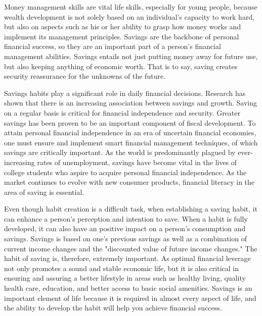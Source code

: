Money management skills are vital life skills, especially for young people, because wealth development is not solely based on an individual's capacity to work hard, but also on aspects such as his or her ability to grasp how money works and implement its management principles. Savings are the backbone of personal financial success, so they are an important part of a person's financial management abilities. Savings entails not just putting money away for future use, but also keeping anything of economic worth. That is to say, saving creates security reassurance for the unknowns of the future.\cite{Loibl}

Savings habits play a significant role in daily financial decisions. Research has shown that there is an increasing association between savings and growth. Saving on a regular basis is critical for financial independence and security. Greater savings has been proven to be an important component of fiscal development. To attain personal financial independence in an era of uncertain financial economies, one must ensure and implement smart financial management techniques, of which savings are critically important. As the world is predominantly plagued by ever-increasing rates of unemployment, savings have become vital in the lives of college students who aspire to acquire personal financial independence.\cite{Fiergbor} As the market continues to evolve with new consumer products, financial literacy in the area of saving is essential.

Even though habit creation is a difficult task, when establishing a saving habit, it can enhance a person's perception and intention to save. When a habit is fully developed, it can also have an positive impact on a person's consumption and savings. Savings is based on one's previous savings as well as a combination of current income changes and the "discounted value of future income changes." The habit of saving is, therefore, extremely important. As optimal financial leverage not only promotes a sound and stable economic life, but it is also critical in ensuring and assuring a better lifestyle in areas such as healthy living, quality health care, education, and better access to basic social amenities.\cite{Alessie} Savings is an important element of life because it is required in almost every aspect of life, and the ability to develop the habit will help you achieve financial success.